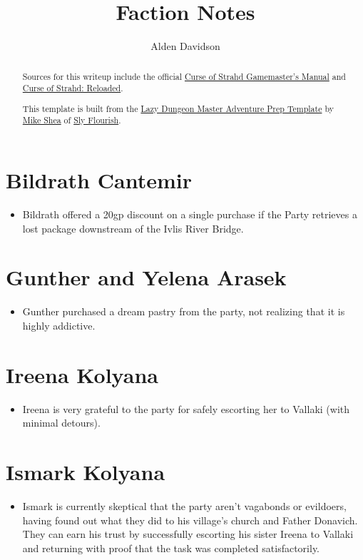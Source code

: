 \documentclass[a4paper,11pt]{article}
\title{Faction Notes}
\author{Alden Davidson}
\begin{document}
\maketitle
\tableofcontents

\begin{abstract}
  Sources for this writeup include the official
  \href{https://5e.tools/adventure.html#cos}{Curse of Strahd Gamemaster's Manual} and
  \href{https://www.reddit.com/r/CurseofStrahd/comments/9bpzbh/curse_of_strahd_reloaded_compilation_thread/}{Curse of Strahd: Reloaded}.
  
  This template is built from the
  \href{https://slyflourish.com/rotldm_template.html}{Lazy Dungeon Master Adventure Prep Template} by
  \href{https://slyflourish.com/about_mike_shea.html}{Mike Shea} of \href{https://slyflourish.com/}{Sly Flourish}.
\end{abstract}

\pagebreak
\section{Bildrath Cantemir}
\begin{itemize}
  \item Bildrath offered a 20gp discount on a single purchase if the Party retrieves a lost package downstream of
  the Ivlis River Bridge.
\end{itemize}

\section{Gunther and Yelena Arasek}
\begin{itemize}
  \item Gunther purchased a dream pastry from the party, not realizing that it is highly addictive.
\end{itemize}

\section{Ireena Kolyana}
\begin{itemize}
  \item Ireena is very grateful to the party for safely escorting her to Vallaki (with minimal detours).
\end{itemize}

\section{Ismark Kolyana}
\begin{itemize}
  \item Ismark is currently skeptical that the party aren't vagabonds or evildoers, having found out what they did
  to his village's church and Father Donavich. They can earn his trust by successfully escorting his sister Ireena
  to Vallaki and returning with proof that the task was completed satisfactorily.
\end{itemize}
\end{document}
